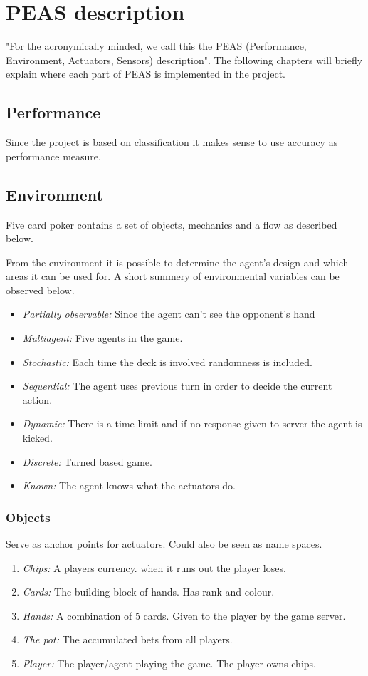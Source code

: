 \documentclass[../main.tex]{subfiles}
\begin{document}
\section{PEAS description}
"For the acronymically minded, we call this the PEAS (Performance, Environment, Actuators, Sensors) description".\cite{AIMA}
The following chapters will briefly explain where each part of PEAS is implemented in the project.

\subsection{Performance}
Since the project is based on classification it makes sense to use accuracy as performance measure. 

\subsection{Environment}
Five card poker contains a set of objects, mechanics and a flow as described below. 

From the environment it is possible to determine the agent's design and which areas it can be used for. A short summery of environmental variables can be observed below.

\begin{itemize}
    \item \textit{Partially observable:} Since the agent can't see the opponent's hand
    \item \textit{Multiagent:} Five agents in the game.
    \item \textit{Stochastic:} Each time the deck is involved randomness is included.
    \item \textit{Sequential:} The agent uses previous turn in order to decide the current action.
    \item \textit{Dynamic:} There is a time limit and if no response given to server the agent is kicked.
    \item \textit{Discrete:} Turned based game.
    \item \textit{Known:} The agent knows what the actuators do.
\end{itemize}

\subsubsection{Objects} 
Serve as anchor points for actuators. Could also be seen as name spaces.
\begin{enumerate}
    \item \textit{Chips:} A players currency. when it runs out the player loses.
    \item \textit{Cards:} The building block of hands. Has rank and colour.
    \item \textit{Hands:} A combination of 5 cards. Given to the player by the game server.
    \item \textit{The pot:} The accumulated bets from all players. 
    \item \textit{Player:} The player/agent playing the game. The player owns chips.
\end{enumerate}
\end{document}
